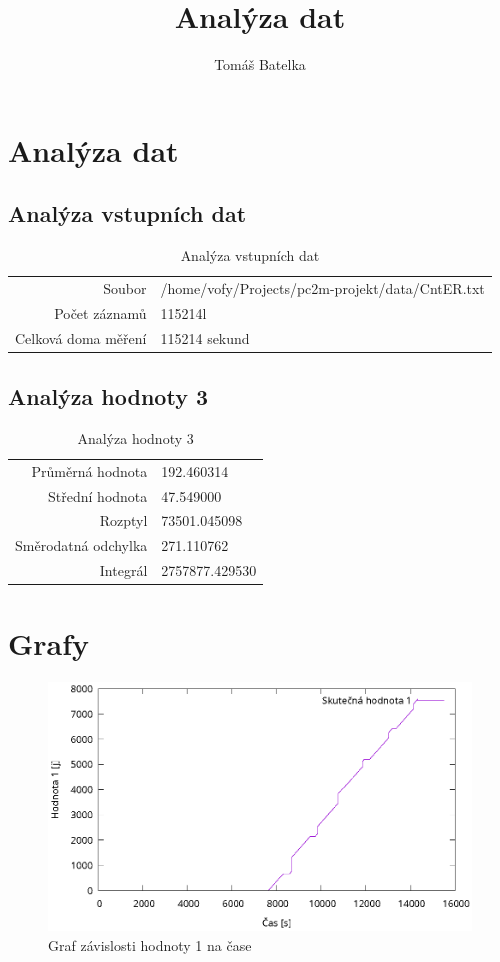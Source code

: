 \documentclass{article}
\title{Analýza dat}
\author{Tomáš Batelka}
\begin{document}
\maketitle

\section{Analýza dat}

\subsection{Analýza vstupních dat}

\begin{table}[h]
    \centering
    \begin{tabular}{r|l}
        Soubor & /home/vofy/Projects/pc2m-projekt/data/CntER.txt \\
        Počet záznamů & 115214l \\
        Celková doma měření & 115214 sekund
    \end{tabular}
    \caption{\label{tab:widgets}Analýza vstupních dat}
\end{table}

\subsection{Analýza hodnoty 3}

\begin{table}[h]
    \centering
    \begin{tabular}{r|l}
        Průměrná hodnota & 192.460314 \\
        Střední hodnota & 47.549000 \\
        Rozptyl & 73501.045098 \\
        Směrodatná odchylka & 271.110762 \\
        Integrál & 2757877.429530
    \end{tabular}
    \caption{\label{tab:widgets}Analýza hodnoty 3}
\end{table}


\section{Grafy}

\begin{figure}[h]
    \centering
    \includegraphics[]{plots/plot1.eps}
    \caption{\label{fig:plot1}Graf závislosti hodnoty 1 na čase}
\end{figure}
\end{document}
